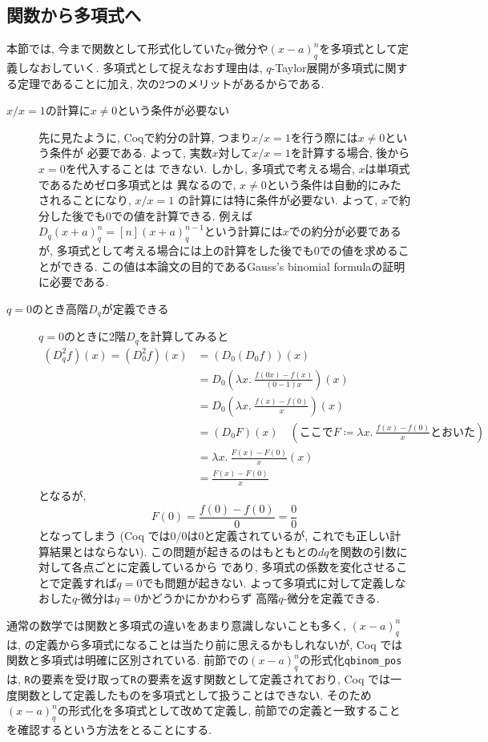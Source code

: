 \documentclass[11pt]{jsreport}
\theoremstyle{mystyle}
\newcommand{\0}{\textbf{0}}
\begin{document}
\subsection{関数から多項式へ} \label{ssec poly}
本節では, 今まで関数として形式化していた$q$-微分や$(x - a)^n_q$を多項式として定義しなおしていく. 多項式として捉えなおす理由は, $q$-Taylor展開が多項式に関する定理であることに加え, 次の2つのメリットがあるからである. 
\begin{description}
\item[$x / x = 1$の計算に$x \neq 0$という条件が必要ない]

  先に見たように, Coqで約分の計算, つまり$x / x = 1$を行う際には$x \ne 0$という条件が
  必要である. よって, 実数$x$対して$x / x = 1$を計算する場合, 後から$x = 0$を代入することは
  できない.   しかし, 多項式で考える場合, $x$は単項式であるためゼロ多項式とは
  異なるので, $x \neq 0$という条件は自動的にみたされることになり, $x / x = 1$
  の計算には特に条件が必要ない. よって, $x$で約分した後でも$0$での値を計算できる.  
  例えば$D_q (x + a)^n_q = [n](x + a)^{n - 1}_q$という計算には$x$での約分が必要であるが, 
  多項式として考える場合には上の計算をした後でも$0$での値を求めることができる. 
  この値は本論文の目的であるGauss's binomial formulaの証明に必要である. 
\item[$q = 0$のとき高階$D_q$が定義できる]

	$q = 0$のときに2階$D_q$を計算してみると
	\begin{align*}
	  (D_q ^2 f) (x) = (D_0 ^2 f) (x) &= (D_0 (D_0 f)) (x) \\
	                    &= D_0 \left( \lambda x.\ \frac{f (0 x) - f(x)}{(0 - 1)x} \right) (x) \\
	                    &= D_0 \left( \lambda x.\ \frac{f(x) - f(0)}{x} \right) (x) \\
	                    &= (D_0 F) (x)
	                      \quad (\text{ここで}F \coloneqq \lambda x.\ \frac{f(x) - f(0)}{x}
	                                \text{とおいた})\\
	                    &= \lambda x.\ \frac{F(x) - F(0)}{x} (x) \\
	                    &= \frac{F(x) - F(0)}{x}
	\end{align*}
	となるが, 
	\[
	  F(0) = \frac{f(0) - f(0)}{0} = \frac{0}{0}
	\]
	となってしまう
	(Coq では$0/0$は$0$と定義されているが, これでも正しい計算結果とはならない).
	この問題が起きるのはもともとの$dq$を関数の引数に対して各点ごとに定義しているから
	であり, 多項式の係数を変化させることで定義すれば$q = 0$でも問題が起きない. 
	よって多項式に対して定義しなおした$q$-微分は$q = 0$かどうかにかかわらず
	高階$q$-微分を定義できる. 
\end{description}
通常の数学では関数と多項式の違いをあまり意識しないことも多く, $(x - a)^n_q$は, \cite{Kac}の定義から多項式になることは当たり前に思えるかもしれないが, Coq では関数と多項式は明確に区別されている. 前節での$(x - a)^n_q$の形式化{\tt qbinom\_pos}は, {\tt R}の要素を受け取って{\tt R}の要素を返す関数として定義されており, Coq では一度関数として定義したものを多項式として扱うことはできない. そのため$(x - a)^n_q$の形式化を多項式として改めて定義し, 前節での定義と一致することを確認するという方法をとることにする. 
\end{document}
